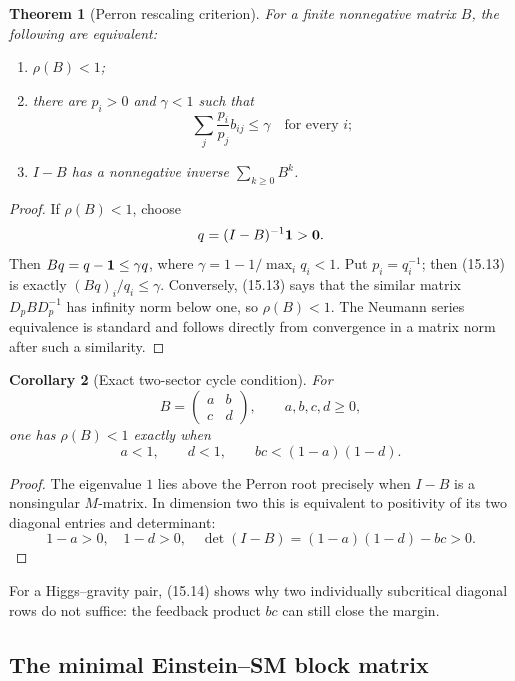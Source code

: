 \documentclass[11pt]{article}
\newtheorem{theorem}{Theorem}[section]
\newtheorem{corollary}[theorem]{Corollary}
\theoremstyle{remark}
\begin{document}
\begin{theorem}[Perron rescaling criterion]
\label{thm:v17v15-perron}
For a finite nonnegative matrix \(B\), the following are equivalent:
\begin{enumerate}
\item \(\rho(B)<1\);
\item there are \(p_i>0\) and \(\gamma<1\) such that
      \[
      \sum_j\frac{p_i}{p_j}b_{ij}\leq\gamma
      \quad\text{for every }i;                     \tag{15.13}
      \]
\item \(I-B\) has a nonnegative inverse
      \(\sum_{k\geq0}B^k\).
\end{enumerate}
\end{theorem}

\begin{proof}
If \(\rho(B)<1\), choose
\[
 q=(I-B)^{-1}{\bf1}>{\bf0}.
\]
Then \(Bq=q-{\bf1}\leq\gamma q\), where
\(\gamma=1-1/\max_iq_i<1\).  Put \(p_i=q_i^{-1}\);
then (15.13) is exactly
\((Bq)_i/q_i\leq\gamma\).  Conversely, (15.13) says that the
similar matrix \(D_pBD_p^{-1}\) has infinity norm below one, so
\(\rho(B)<1\).  The Neumann series equivalence is standard and
follows directly from convergence in a matrix norm after such a
similarity.
\end{proof}

\begin{corollary}[Exact two-sector cycle condition]
\label{cor:v17v15-two-sector}
For
\[
 B=\begin{pmatrix}a&b\\c&d\end{pmatrix},
 \qquad a,b,c,d\geq0,
\]
one has \(\rho(B)<1\) exactly when
\[
 a<1,\qquad d<1,\qquad
 bc<(1-a)(1-d).                                    \tag{15.14}
\]
\end{corollary}

\begin{proof}
The eigenvalue \(1\) lies above the Perron root precisely when
\(I-B\) is a nonsingular \(M\)-matrix.  In dimension two this is
equivalent to positivity of its two diagonal entries and determinant:
\[
 1-a>0,\quad1-d>0,\quad
 \det(I-B)=(1-a)(1-d)-bc>0.
\]
\end{proof}

For a Higgs--gravity pair, (15.14) shows why two individually
subcritical diagonal rows do not suffice: the feedback product
\(bc\) can still close the margin.

\subsection{The minimal Einstein--SM block matrix}
\end{document}
